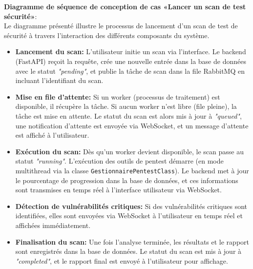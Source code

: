 \textbf{Diagramme de séquence de conception de cas «Lancer un scan de test sécurité»}:\\
Le diagramme présenté illustre le processus de lancement d’un scan de test de sécurité à travers l'interaction des différents composants du système.
\begin{itemize}[label=$-$]
    \item \textbf{Lancement du scan:} L’utilisateur initie un scan via l’interface. Le backend (FastAPI) reçoit la requête, crée une nouvelle entrée dans la base de données avec le statut \textit{"pending"}, et publie la tâche de scan dans la file RabbitMQ en incluant l'identifiant du scan.
    \item \textbf{Mise en file d’attente:} Si un worker (processus de traitement) est disponible, il récupère la tâche. Si aucun worker n’est libre (file pleine), la tâche est mise en attente. Le statut du scan est alors mis à jour à \textit{"queued"}, une notification d’attente est envoyée via WebSocket, et un message d’attente est affiché à l’utilisateur.
    \item \textbf{Exécution du scan:} Dès qu’un worker devient disponible, le scan passe au statut \textit{"running"}. L’exécution des outils de pentest démarre (en mode multithread via la classe \texttt{GestionnairePentestClass}). Le backend met à jour le pourcentage de progression dans la base de données, et ces informations sont transmises en temps réel à l’interface utilisateur via WebSocket.
    \item \textbf{Détection de vulnérabilités critiques:} Si des vulnérabilités critiques sont identifiées, elles sont envoyées via WebSocket à l’utilisateur en temps réel et affichées immédiatement.
    \item \textbf{Finalisation du scan:} Une fois l’analyse terminée, les résultats et le rapport sont enregistrés dans la base de données. Le statut du scan est mis à jour à \textit{"completed"}, et le rapport final est envoyé à l’utilisateur pour affichage.
\end{itemize}

